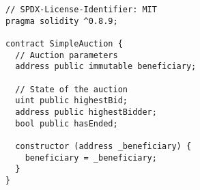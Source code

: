 \begin{lstlisting}[language=Solidity]
// SPDX-License-Identifier: MIT
pragma solidity ^0.8.9;

contract SimpleAuction {
  // Auction parameters
  address public immutable beneficiary;
  
  // State of the auction
  uint public highestBid;
  address public highestBidder;
  bool public hasEnded;

  constructor (address _beneficiary) {
    beneficiary = _beneficiary;
  }
}
\end{lstlisting}